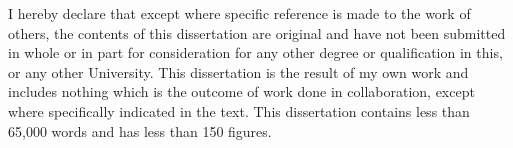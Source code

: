 
\begin{declaration}

I hereby declare that except where specific reference is made to the work of others, the contents of this dissertation are original and have not been submitted in whole or in part for consideration for any other degree or qualification in this, or any other University.
This dissertation is the result of my own work and includes nothing which is the outcome of work done in collaboration, except where specifically indicated in the text.
This dissertation contains less than 65,000 words and has less than 150 figures.


\end{declaration}

